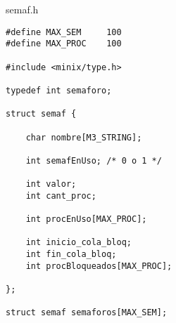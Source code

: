 semaf.h

\begin{verbatim}
#define MAX_SEM 	100	
#define MAX_PROC 	100

#include <minix/type.h>

typedef int semaforo;

struct semaf {

	char nombre[M3_STRING];

	int semafEnUso; /* 0 o 1 */

	int valor;
	int cant_proc;

	int procEnUso[MAX_PROC];

	int inicio_cola_bloq;
	int fin_cola_bloq;
	int procBloqueados[MAX_PROC];

};

struct semaf semaforos[MAX_SEM];
\end{verbatim}
